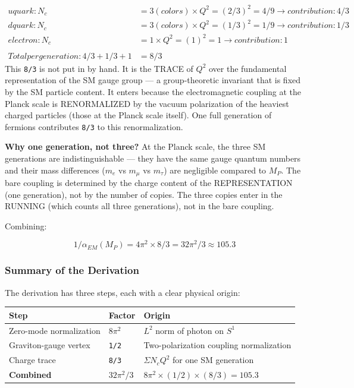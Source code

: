 \documentclass[aps,prd,preprint,superscriptaddress,longbibliography,floatfix]{revtex4-2}
\theoremstyle{remark}
\begin{document}
\begin{align}
    u quark:  N_c &= 3 (colors) \times Q^{2} = (2/3)^{2} = 4/9  \to contribution: 4/3 \\
    d quark:  N_c &= 3 (colors) \times Q^{2} = (1/3)^{2} = 1/9  \to contribution: 1/3 \\
    electron: N_c &= 1           \times Q^{2} = (1)^{2}   = 1    \to contribution: 1 \\
    &  \\
    Total per generation: 4/3 + 1/3 + 1 &= 8/3
\end{align}
This \texttt{8/3} is not put in by hand. It is the TRACE of $Q^{2}$ over the fundamental representation of the SM gauge group --- a group-theoretic invariant that is fixed by the SM particle content. It enters because the electromagnetic coupling at the Planck scale is RENORMALIZED by the vacuum polarization of the heaviest charged particles (those at the Planck scale itself). One full generation of fermions contributes \texttt{8/3} to this renormalization.

\textbf{Why one generation, not three?} At the Planck scale, the three SM generations are indistinguishable --- they have the same gauge quantum numbers and their mass differences ($m_e$ vs $m_\mu$ vs $m_\tau$) are negligible compared to $M_P$. The bare coupling is determined by the charge content of the REPRESENTATION (one generation), not by the number of copies. The three copies enter in the RUNNING (which counts all three generations), not in the bare coupling.

Combining:


\begin{equation}
    1/\alpha_{EM}(M_P) = 4\pi^{2} \times 8/3 = 32\pi^{2}/3 \approx 105.3
\end{equation}

\subsubsection{Summary of the Derivation}

The derivation has three steps, each with a clear physical origin:


\begin{table}[H]
\begin{ruledtabular}
\begin{tabular}{p{5.0cm}p{5.0cm}p{5.0cm}}
Step & Factor & Origin \\
\hline
Zero-mode normalization & $8\pi^{2}$ & $L^{2}$ norm of photon on $S^{1}$ \\
Graviton-gauge vertex & \texttt{1/2} & Two-polarization coupling normalization \\
Charge trace & \texttt{8/3} & $\Sigma N_c Q^{2}$ for one SM generation \\
\textbf{Combined} & \textbf{$32\pi^{2}/3$} & \textbf{$8\pi^{2} \times (1/2) \times (8/3) = 105.3$} \\
\end{tabular}
\end{ruledtabular}
\end{table}
\end{document}
